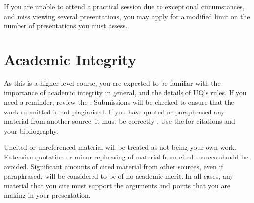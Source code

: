 \documentclass{csse4400}
\begin{document}
If you are unable to attend a practical session due to exceptional circumstances,
and miss viewing several presentations,
you may apply for a modified limit on the number of presentations you must assess.

\section{Academic Integrity}
As this is a higher-level course, you are expected to be familiar with the importance of academic integrity in general, and the details of UQ's rules.
If you need a reminder, review the .
Submissions will be checked to ensure that the work submitted is not plagiarised.
If you have quoted or paraphrased any material from another source, it must be correctly .
Use the  for citations and your bibliography.

Uncited or unreferenced material will be treated as not being your own work.
Extensive quotation or minor rephrasing of material from cited sources should be avoided.
Significant amounts of cited material from other sources, even if paraphrased, will be considered to be of no academic merit.
In all cases, any material that you cite must support the arguments and points that you are making in your presentation.
\end{document}
